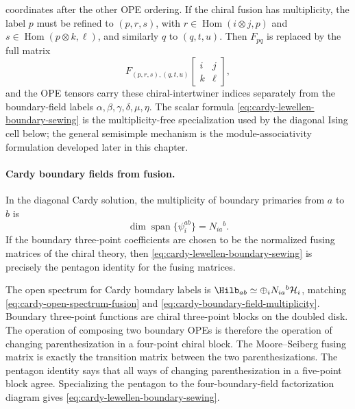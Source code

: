 coordinates after the other OPE ordering.  If the chiral fusion has
multiplicity, the label \(p\) must be refined to
\((p,r,s)\), with
\(r\in\operatorname{Hom}(i\otimes j,p)\) and
\(s\in\operatorname{Hom}(p\otimes k,\ell)\), and similarly
\(q\) to \((q,t,u)\).  Then \(F_{pq}\) is replaced by the full matrix
\[
  F_{(p,r,s),(q,t,u)}
  \!\begin{bmatrix} i&j\\ k&\ell \end{bmatrix},
\]
and the OPE tensors carry these chiral-intertwiner indices separately from the
boundary-field labels \(\alpha,\beta,\gamma,\delta,\mu,\eta\).  The scalar
formula \eqref{eq:cardy-lewellen-boundary-sewing} is the
multiplicity-free specialization used by the diagonal Ising cell below; the
general semisimple mechanism is the module-associativity formulation developed
later in this chapter.

\paragraph{Cardy boundary fields from fusion.}
In the diagonal Cardy solution, the multiplicity of boundary primaries from
\(a\) to \(b\) is
\begin{equation}
  \dim\operatorname{span}\{\psi^{ab}_i\}=N_{ia}{}^b .
  \label{eq:cardy-boundary-field-multiplicity}
\end{equation}
If the boundary three-point coefficients are chosen to be the normalized
fusing matrices of the chiral theory, then
\eqref{eq:cardy-lewellen-boundary-sewing} is precisely the pentagon identity
for the fusing matrices.

The open spectrum for Cardy boundary labels is
\(\Hilb_{ab}\simeq\oplus_iN_{ia}{}^b\mathcal H_i\), matching
\eqref{eq:cardy-open-spectrum-fusion} and
\eqref{eq:cardy-boundary-field-multiplicity}.  Boundary three-point functions
are chiral three-point blocks on the doubled disk.  The operation of
composing two boundary OPEs is therefore the operation of changing
parenthesization in a four-point chiral block.  The Moore--Seiberg fusing
matrix is exactly the transition matrix between the two parenthesizations.
The pentagon identity says that all ways of changing parenthesization in a
five-point block agree.  Specializing the pentagon to the
four-boundary-field factorization diagram gives
\eqref{eq:cardy-lewellen-boundary-sewing}.


